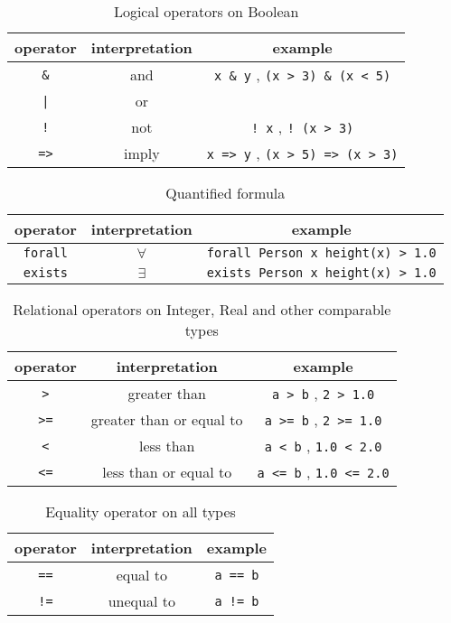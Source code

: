 \documentclass[12pt]{article}
\begin{document}
\begin{table}[H]
\centering
\caption{Logical operators on Boolean}
\begin{tabular}{ c c c }
\toprule 
operator & interpretation & example \\
\midrule
\verb|&| & and & \verb|x & y| , \verb|(x > 3) & (x < 5)| \\ 
{\tt |} & or & \verb\x | y\ , \verb\(x > 5) | (x < 3)\ \\ 
{\tt !} & not & \verb|! x| , \verb|! (x > 3)| \\
{\tt =>} & imply & \verb|x => y| , \verb|(x > 5) => (x > 3)| \\
\bottomrule
\end{tabular}
\end{table}

\begin{table}[H]
\centering
\caption{Quantified formula}
\begin{tabular}{ c c c }
\toprule 
operator & interpretation & example \\
\midrule
{\tt forall} & $\forall$ & \verb|forall Person x height(x) > 1.0| \\ 
{\tt exists} & $\exists$ & \verb|exists Person x height(x) > 1.0|  \\ 
\bottomrule
\end{tabular}
\end{table}

\begin{table}[H]
\centering
\caption{Relational operators on Integer, Real and other comparable types}
\begin{tabular}{ c c c }
\toprule 
operator & interpretation & example \\
\midrule
{\tt >} & greater than & \verb|a > b| ,  \verb|2 > 1.0|\\ 
{\tt >=} & greater than or equal to & \verb|a >= b| ,  \verb|2 >= 1.0| \\ 
{\tt <} & less than & \verb|a < b| ,  \verb|1.0 < 2.0| \\
{\tt <=} & less than or equal to & \verb|a <= b| ,  \verb|1.0 <= 2.0|  \\
\bottomrule
\end{tabular}
\end{table}

\begin{table}[H]
\centering
\caption{Equality operator on all types}
\begin{tabular}{ c c c }
\toprule 
operator & interpretation & example \\
\midrule
{\tt ==} & equal to & \verb|a == b|   \\ 
{\tt !=} & unequal to & \verb|a != b|  \\ 
\bottomrule
\end{tabular}
\end{table}
\end{document}
